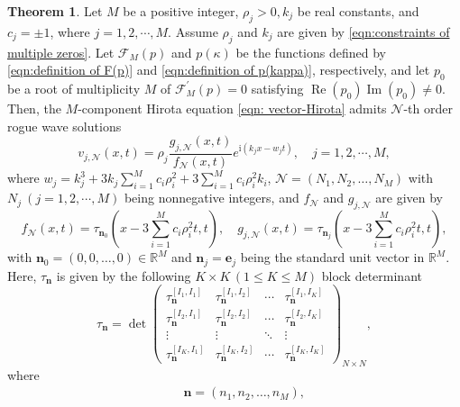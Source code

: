 \documentclass[preprint,3p,10pt]{elsarticle}
\renewcommand{\Re}{\operatorname{Re}}
\renewcommand{\Im}{\operatorname{Im}}
\theoremstyle{definition}
\newtheorem{theorem}{Theorem}[section]
\begin{document}
\begin{theorem}\label{thm:rogue wave solutions}
Let $M$ be a positive integer,  $\rho_j >0, k_j$ be real constants, and $c_j=\pm1 $, where $j=1,2,\cdots,M$. Assume  $ \rho_j $ and $ k_j$ are given by \eqref{eqn:constraints of multiple zeros}. Let $\mathcal{F}_M(p)$ and $p(\kappa)$ be the functions defined by \eqref{eqn:definition of F(p)} and \eqref{eqn:definition of p(kappa)}, respectively, and let $p_0$ be a root of multiplicity $M$ of $\mathcal{F}_M^{\prime}(p)=0$ satisfying
$\Re(p_0)\Im(p_0)\neq0$. Then, the $M$-component Hirota equation \eqref{eqn: vector-Hirota} admits $\mathcal{N}$-th order rogue wave solutions
\begin{equation} \label{eqn:N-order rogue wave solutions of MHirota}
 v_{j,\mathcal{N}}(x,t) = \rho_{j}\frac{g_{j,\mathcal{N}}(x,t)}{f_{\mathcal{N}}(x,t)}  e^{\mathrm{i}\left(k_j x-w_j t\right)} , \quad j=1,2,\cdots,M,
\end{equation}
where $w_j=k_j^3+3k_j\sum_{i=1}^{M}c_i \rho_i^2+3\sum_{i=1}^{M}c_i\rho_i^2 k_i$, $\mathcal{N} = \left(N_1, N_2, \ldots, N_M\right)$ with $N_j~(j=1,2,\cdots,M)$ being nonnegative integers,
and $f_{\mathcal{N}}$ and $g_{j,\mathcal{N}}$ are given by
\begin{equation}
f_{\mathcal{N}}(x,t)=\tau_{\mathbf{n}_0}\left(x-3\sum_{i=1}^{M}c_i \rho_i^2 t,t\right), \quad g_{j,\mathcal{N}}(x,t)=\tau_{\mathbf{n}_j}\left(x-3\sum_{i=1}^{M}c_i \rho_i^2 t,t\right),
\end{equation}
with $\mathbf{n}_0=(0,0, \ldots, 0) \in \mathbb{R}^M$ and $\mathbf{n}_j= \mathbf{e}_j$ being the standard unit vector in $\mathbb{R}^M$. Here, $\tau_{\mathbf{n}}$ is given by the following $K \times K \, (1\leq K \leq M) $ block determinant
\begin{equation} \label{tau-block matrix-theorem}
\tau_{\mathbf{n}}=\det\left(\begin{array}{llll}
\tau_{\mathbf{n}}^{[I_1,I_1]} & \tau_{\mathbf{n}}^{[I_1,I_2]}&\cdots&\tau_{\mathbf{n}}^{[I_1,I_K]} \\
\tau_{\mathbf{n}}^{[I_2,I_1]} & \tau_{\mathbf{n}}^{[I_2,I_2]}&\cdots&\tau_{\mathbf{n}}^{[I_2,I_K]} \\ \vdots & \vdots& \ddots &\vdots \\\tau_{\mathbf{n}}^{[I_K,I_1]} & \tau_{\mathbf{n}}^{[I_K,I_2]}&\cdots&\tau_{\mathbf{n}}^{[I_K,I_K]}
\end{array}\right)_{N \times N},
\end{equation}
where
\begin{eqnarray}
&&\mathbf{n}=\left(n_1, n_2, \ldots, n_M\right),

\end{eqnarray}
\end{theorem}
\end{document}
